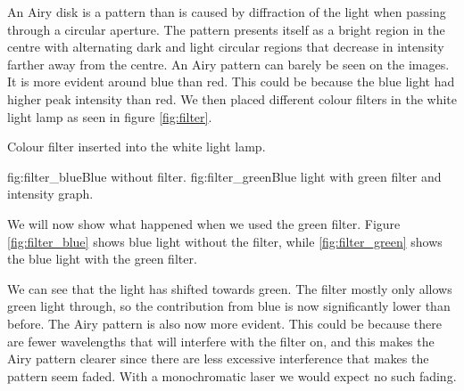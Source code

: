 An Airy disk is a pattern than is caused by diffraction of the light when passing through a circular aperture. The pattern presents itself as a bright region in the centre with alternating dark and light circular regions that decrease in intensity farther away from the centre. An Airy pattern can barely be seen on the images. It is more evident around blue than red. This could be because the blue light had higher peak intensity than red. We then placed different colour filters in the white light lamp as seen in figure \vref{fig:filter}.

    {Colour filter inserted into the white light lamp.}

    {fig:filter_blue}{Blue without filter.}
    {fig:filter_green}{Blue light with green filter and intensity graph.}

We will now show what happened when we used the green filter. Figure \vref{fig:filter_blue} shows blue light without the filter, while \vref{fig:filter_green} shows the blue light with the green filter.

We can see that the light has shifted towards green. The filter mostly only allows green light through, so the contribution from blue is now significantly lower than before. The Airy pattern is also now more evident. This could be because there are fewer wavelengths that will interfere with the filter on, and this makes the Airy pattern clearer since there are less excessive interference that makes the pattern seem faded. With a monochromatic laser we would expect no such fading.

